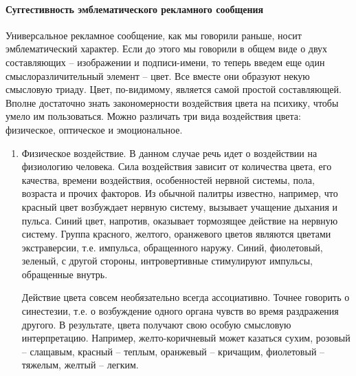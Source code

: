\paragraph{Суггестивность эмблематического рекламного сообщения}
Универсальное рекламное сообщение, как мы говорили раньше, носит эмблематический
характер. Если  до этого мы говорили в общем виде о двух составляющих --
изображении и подписи-имени, то теперь введем еще один смыслоразличительный
элемент -- цвет. Все вместе они образуют некую смысловую триаду. Цвет,
по-видимому, является самой простой составляющей. Вполне достаточно знать
закономерности воздействия цвета на психику, чтобы умело им пользоваться.
Можно различать три вида воздействия цвета: физическое, оптическое и
эмоциональное\autocite{tsoygner1971}\autocite{serov1997estetika}\autocite{kandinsky2001dohovnom}.
\begin{enumerate}
\item Физическое воздействие. В данном случае речь идет о воздействии на
  физиологию человека. Сила воздействия зависит от количества цвета,
  его качества, времени воздействия, особенностей нервной системы, пола,
  возраста и прочих факторов. Из обычной палитры известно, например, что
  красный цвет возбуждает нервную систему, вызывает учащение дыхания и
  пульса. Синий цвет, напротив, оказывает тормозящее действие на нервную
  систему. Группа красного, желтого, оранжевого цветов являются цветами
  экстраверсии, т.е. импульса, обращенного наружу. Синий, фиолетовый,
  зеленый, с другой стороны,  интровертивные стимулируют импульсы, обращенные
  внутрь.

  Действие цвета совсем необязательно всегда ассоциативно. Точнее говорить о
  синестезии, т.е. о возбуждение одного органа чувств во время раздражения
  другого. В результате, цвета получают свою особую смысловую интерпретацию.
  Например, желто-коричневый может казаться сухим,  розовый -- слащавым,
  красный -- теплым, оранжевый -- кричащим, фиолетовый -- тяжелым, желтый -- легким.


\end{enumerate}
